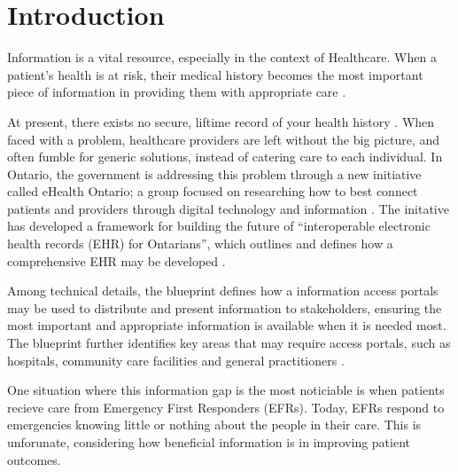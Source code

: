 
\section{Introduction}
\par Information is a vital resource, especially in the context of Healthcare. When a patient's health is at risk, their medical history becomes the most important piece of information in providing them with appropriate care \cite{web1}.

At present, there exists no secure, liftime record of your health history \cite{Street2014}. When faced with a problem, healthcare providers are left without the big picture, and often fumble for generic solutions, instead of catering care to each individual. In Ontario, the government is addressing this problem through a new initiative called eHealth Ontario; a group focused on researching how to best connect patients and providers through digital technology and information \cite{web1}. The initative has developed a framework for building the future of ``interoperable electronic health records (EHR) for Ontarians'', which outlines and defines how a comprehensive EHR may be developed \cite{b1}.

Among technical details, the blueprint defines how a information access portals may be used to distribute and present information to stakeholders, ensuring the most important and appropriate information is available when it is needed most. The blueprint further identifies key areas that may require access portals, such as hospitals, community care facilities and general practitioners \cite{Street2014}.

\iffalse where access portals may be

 in the most effective and streamlined manner. The blueprint identifies key areas,


centralized system with standardized records, accessed by different portals may be used to

 The group has developed a technical blueprint for how health information may

The blueprint is the framework for building ``interoperable electrnoic health records for Ontarions'' \fi

\iffalse The Ontario government is looking to solve this problem through the eHealth Ontario initiative, a group researching how best to impliment digital technologies that connect patients and providers through information \cite{web1}.\fi

One situation where this information gap is the most noticiable is when patients recieve care from Emergency First Responders (EFRs). Today, EFRs respond to emergencies knowing little or nothing about the people in their care. This is unforunate, considering how beneficial information is in improving patient outcomes. \iffalse For example, nursing homes often carry documents that contain health information on their residents. This information, including medications, allergies and diagonsed disorders gives EFRs an important base-knowledge for how assessing a patient. \fi

